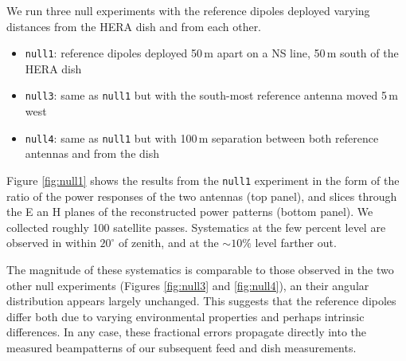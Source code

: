 \documentclass{emulateapj}
\begin{document}
We run three null experiments with the reference dipoles deployed varying distances from the HERA dish and from each other.

\begin{itemize}
\item \texttt{null1}: reference dipoles deployed 50\,m apart on a NS line, 50\,m south of the HERA dish
\item \texttt{null3}: same as \texttt{null1} but with the south-most reference antenna moved 5\,m west
\item \texttt{null4}: same as \texttt{null1} but with 100\,m separation between both reference antennas and from the dish
\end{itemize}

Figure \ref{fig:null1} shows the results from the \texttt{null1} experiment in the form of the ratio of the power responses of the two antennas (top panel), and slices through the E an H planes of the reconstructed power patterns (bottom panel). We collected roughly 100 satellite passes. Systematics at the few percent level are observed in  within $20^\circ$ of zenith, and at the $\sim10\%$ level farther out.

The magnitude of these systematics is comparable to those observed in the two other null experiments (Figures \ref{fig:null3} and \ref{fig:null4}), an their angular distribution appears largely unchanged. This suggests that the reference dipoles differ both due to varying environmental properties and perhaps intrinsic differences. In any case, these fractional errors propagate directly into the measured beampatterns of our subsequent feed and dish measurements.  
\end{document}

